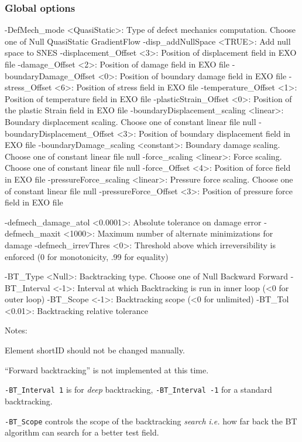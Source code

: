 \documentclass[10pt,oneside]{memoir}
\begin{document}
\subsubsection{Global options}
\small{\begin{boxedverbatim}
-DefMech_mode <QuasiStatic>: Type of defect mechanics computation. 
                             Choose one of Null QuasiStatic GradientFlow
-disp_addNullSpace <TRUE>: Add null space to SNES 
-displacement_Offset <3>: Position of displacement field in EXO file 
-damage_Offset <2>: Position of damage field in EXO file 
-boundaryDamage_Offset <0>: Position of boundary damage field in EXO file 
-stress_Offset <6>: Position of stress field in EXO file 
-temperature_Offset <1>: Position of temperature field in EXO file 
-plasticStrain_Offset <0>: Position of the plastic Strain field in EXO file 
-boundaryDisplacement_scaling <linear>: Boundary displacement scaling.
                                        Choose one of constant linear file null
-boundaryDisplacement_Offset <3>: Position of boundary displacement field in EXO file 
-boundaryDamage_scaling <constant>: Boundary damage scaling.
                                    Choose one of constant linear file null
-force_scaling <linear>: Force scaling. 
                         Choose one of constant linear file null
-force_Offset <4>: Position of force field in EXO file 
-pressureForce_scaling <linear>: Pressure force scaling. 
                                 Choose one of constant linear file null
-pressureForce_Offset <3>: Position of pressure force field in EXO file 

-defmech_damage_atol <0.0001>: Absolute tolerance on damage error 
-defmech_maxit <1000>: Maximum number of alternate minimizations for damage 
-defmech_irrevThres <0>: Threshold above which irreversibility is enforced 
                        (0 for monotonicity, .99 for equality) 

-BT_Type <Null>: Backtracking type.
                 Choose one of Null Backward Forward
-BT_Interval <-1>: Interval at which Backtracking is run in inner loop 
                   (<0 for outer loop) 
-BT_Scope <-1>: Backtracking scope (<0 for unlimited) 
-BT_Tol <0.01>: Backtracking relative tolerance 
\end{boxedverbatim}}
Notes:
\begin{compactenum}
\item Element shortID should not be changed manually. 
\item ``Forward backtracking'' is not implemented at this time.
\item \verb+-BT_Interval 1+ is for \emph{deep} backtracking, \verb+-BT_Interval -1+ for a standard backtracking.
\item \verb+-BT_Scope+ controls the scope of the backtracking \emph{search} \emph{i.e.} how far back the BT algorithm can search for a better test field.
\end{compactenum}
\end{document}
